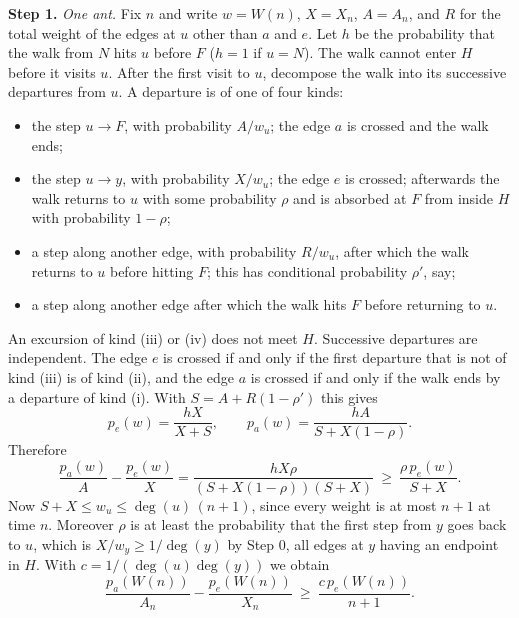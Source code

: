 \documentclass[11pt]{amsart}
\theoremstyle{remark}
\begin{document}
\medskip\noindent\textbf{Step 1.} \emph{One ant.} Fix $n$ and write $w=W(n)$, $X=X_n$, $A=A_n$, and $R$ for the
total weight of the edges at $u$ other than $a$ and $e$. Let $h$ be the probability that the walk from $N$ hits $u$
before $F$ ($h=1$ if $u=N$). The walk cannot enter $H$ before it visits $u$. After the first visit to $u$, decompose
the walk into its successive departures from $u$. A departure is of one of four kinds:
\begin{itemize}
\item[(i)] the step $u\to F$, with probability $A/w_u$; the edge $a$ is crossed and the walk ends;
\item[(ii)] the step $u\to y$, with probability $X/w_u$; the edge $e$ is crossed; afterwards the walk returns to $u$
with some probability $\rho$ and is absorbed at $F$ from inside $H$ with probability $1-\rho$;
\item[(iii)] a step along another edge, with probability $R/w_u$, after which the walk returns to $u$ before hitting
$F$; this has conditional probability $\rho'$, say;
\item[(iv)] a step along another edge after which the walk hits $F$ before returning to $u$.
\end{itemize}
An excursion of kind (iii) or (iv) does not meet $H$. Successive departures are independent. The edge $e$ is crossed
if and only if the first departure that is not of kind (iii) is of kind (ii), and the edge $a$ is crossed if and only
if the walk ends by a departure of kind (i). With $S=A+R(1-\rho')$ this gives
\begin{equation}\label{eq:pe}
p_e(w)=\frac{hX}{X+S},\qquad p_a(w)=\frac{hA}{S+X(1-\rho)} .
\end{equation}
Therefore
\begin{equation}\label{eq:diff}
\frac{p_a(w)}{A}-\frac{p_e(w)}{X}=\frac{hX\rho}{(S+X(1-\rho))(S+X)}\ \ge\ \frac{\rho\,p_e(w)}{S+X}.
\end{equation}
Now $S+X\le w_u\le\deg(u)\,(n+1)$, since every weight is at most $n+1$ at time $n$. Moreover $\rho$ is at least the
probability that the first step from $y$ goes back to $u$, which is $X/w_y\ge1/\deg(y)$ by Step 0, all edges at $y$
having an endpoint in $H$. With $c=1/(\deg(u)\deg(y))$ we obtain
\begin{equation}\label{eq:drift}
\frac{p_a(W(n))}{A_n}-\frac{p_e(W(n))}{X_n}\ \ge\ \frac{c\,p_e(W(n))}{n+1}.
\end{equation}
\end{document}
